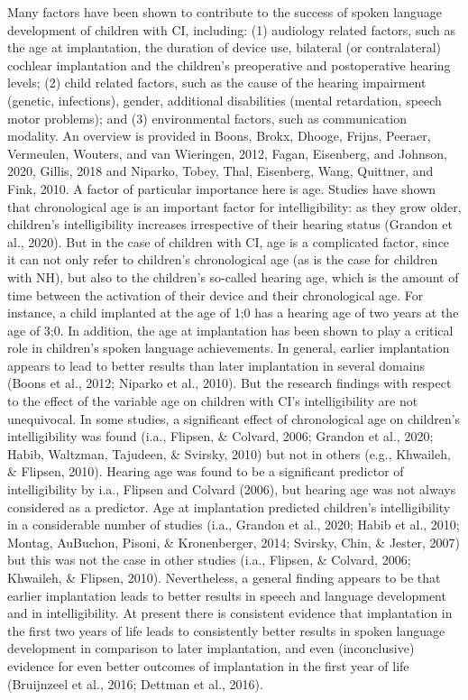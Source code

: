 Many factors have been shown to contribute to the success of spoken language development of children with CI, including: (1) audiology related factors, such as the age at implantation, the duration of device use, bilateral (or contralateral) cochlear implantation and the children’s preoperative and postoperative hearing levels; (2) child related factors, such as the cause of the hearing impairment (genetic, infections), gender, additional disabilities (mental retardation, speech motor problems); and (3) environmental factors, such as communication modality. An overview is provided in Boons, Brokx, Dhooge, Frijns, Peeraer, Vermeulen, Wouters, and van Wieringen, 2012, Fagan,
Eisenberg, and Johnson, 2020, Gillis, 2018 and Niparko, Tobey, Thal, Eisenberg, Wang,
Quittner, and Fink, 2010. A factor of particular importance here is age. Studies have shown
that chronological age is an important factor for intelligibility: as they grow older, children’s intelligibility increases irrespective of their hearing status (Grandon et al., 2020). But in the case of children with CI, age is a complicated factor, since it can not only refer to children’s chronological age (as is the case for children with NH), but also to the children’s so-called hearing age, which is the amount of time between the activation of their device and their chronological age. For instance, a child implanted at the age of 1;0 has a hearing age of two years at the age of 3;0. In addition, the age at implantation has been shown to play a critical role in children’s spoken language achievements. In general, earlier implantation appears to lead to better results than later implantation in several domains (Boons et al., 2012; Niparko et al., 2010). But the research findings with respect to the effect of the variable age on children with CI’s intelligibility are not unequivocal. In some studies, a significant effect of chronological age on children’s intelligibility was found (i.a., Flipsen, \& Colvard, 2006;
Grandon et al., 2020; Habib, Waltzman, Tajudeen, \& Svirsky, 2010) but not in others (e.g.,
Khwaileh, \& Flipsen, 2010). Hearing age was found to be a significant predictor of intelligibility by i.a., Flipsen and Colvard (2006), but hearing age was not always considered as a predictor. Age at implantation predicted children’s intelligibility in a considerable number of studies (i.a., Grandon et al., 2020; Habib et al., 2010; Montag, AuBuchon, Pisoni, \& Kronenberger, 2014; Svirsky, Chin, \& Jester, 2007) but this was not the case in other studies (i.a., Flipsen, \& Colvard, 2006; Khwaileh, \& Flipsen, 2010). Nevertheless, a general finding appears to be that earlier implantation leads to better results in speech and language development and in intelligibility. At present there is consistent evidence that implantation in the first two years of life leads to consistently better results in spoken language development in comparison to later implantation, and even (inconclusive) evidence for even better outcomes of implantation in the first year of life (Bruijnzeel et al., 2016; Dettman et al., 2016).



